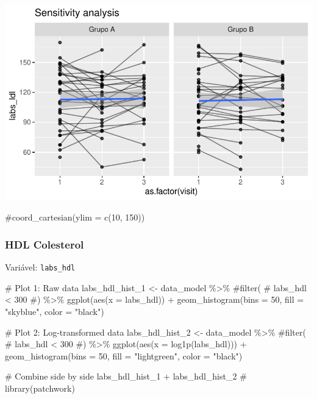 \documentclass[
  letterpaper,
  DIV=11,
  numbers=noendperiod]{scrartcl}
\newenvironment{Shaded}{\begin{snugshade}}{\end{snugshade}}
\newcommand{\AttributeTok}[1]{\textcolor[rgb]{0.40,0.45,0.13}{#1}}
\newcommand{\CommentTok}[1]{\textcolor[rgb]{0.37,0.37,0.37}{#1}}
\newcommand{\DecValTok}[1]{\textcolor[rgb]{0.68,0.00,0.00}{#1}}
\newcommand{\FunctionTok}[1]{\textcolor[rgb]{0.28,0.35,0.67}{#1}}
\newcommand{\NormalTok}[1]{\textcolor[rgb]{0.00,0.23,0.31}{#1}}
\newcommand{\OtherTok}[1]{\textcolor[rgb]{0.00,0.23,0.31}{#1}}
\newcommand{\SpecialCharTok}[1]{\textcolor[rgb]{0.37,0.37,0.37}{#1}}
\newcommand{\StringTok}[1]{\textcolor[rgb]{0.13,0.47,0.30}{#1}}
\begin{document}
\includegraphics{Outcomes_V1V2V3_files/figure-pdf/labs_ldl_6-2.pdf}

\begin{Shaded}
\begin{Highlighting}[]
    \CommentTok{\#coord\_cartesian(ylim = c(10, 150))}
\end{Highlighting}
\end{Shaded}

\subsubsection{HDL Colesterol}\label{hdl-colesterol}

Variável: \texttt{labs\_hdl}

\begin{Shaded}
\begin{Highlighting}[]
\CommentTok{\# Plot 1: Raw data}
\NormalTok{labs\_hdl\_hist\_1 }\OtherTok{\textless{}{-}}\NormalTok{ data\_model }\SpecialCharTok{\%\textgreater{}\%} 
    \CommentTok{\#filter(}
    \CommentTok{\#    labs\_hdl \textless{} 300}
    \CommentTok{\#) \%\textgreater{}\% }
    \FunctionTok{ggplot}\NormalTok{(}\FunctionTok{aes}\NormalTok{(}\AttributeTok{x =}\NormalTok{ labs\_hdl)) }\SpecialCharTok{+} 
    \FunctionTok{geom\_histogram}\NormalTok{(}\AttributeTok{bins =} \DecValTok{50}\NormalTok{, }\AttributeTok{fill =} \StringTok{"skyblue"}\NormalTok{, }\AttributeTok{color =} \StringTok{"black"}\NormalTok{)}

\CommentTok{\# Plot 2: Log{-}transformed data}
\NormalTok{labs\_hdl\_hist\_2 }\OtherTok{\textless{}{-}}\NormalTok{ data\_model }\SpecialCharTok{\%\textgreater{}\%} 
    \CommentTok{\#filter(}
    \CommentTok{\#    labs\_hdl \textless{} 300}
    \CommentTok{\#) \%\textgreater{}\%}
    \FunctionTok{ggplot}\NormalTok{(}\FunctionTok{aes}\NormalTok{(}\AttributeTok{x =} \FunctionTok{log1p}\NormalTok{(labs\_hdl))) }\SpecialCharTok{+} 
    \FunctionTok{geom\_histogram}\NormalTok{(}\AttributeTok{bins =} \DecValTok{50}\NormalTok{, }\AttributeTok{fill =} \StringTok{"lightgreen"}\NormalTok{, }\AttributeTok{color =} \StringTok{"black"}\NormalTok{)}

\CommentTok{\# Combine side by side}
\NormalTok{labs\_hdl\_hist\_1 }\SpecialCharTok{+}\NormalTok{ labs\_hdl\_hist\_2 }\CommentTok{\# library(patchwork)}
\end{Highlighting}
\end{Shaded}
\end{document}
